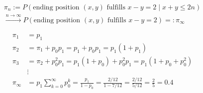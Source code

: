 \begin{solution}
\begin{enumerate}[label = (\alph*)]
    \begin{multline*}
        \pi_n
        :=
        P(\text{ending position $(x, y)$ fulfills $x - y = 2$} \mid x + y \leq 2 n) \\
        \xrightarrow{n \to \infty}
        P(\text{ending position $(x, y)$ fulfills $x - y = 2$}) =: \pi_\infty
    \end{multline*}

    \begin{align*}
        \pi_1 & = p_1 \\
        \pi_2 & = \pi_1 + p_0 p_1 = p_1 + p_0 p_1 = p_1 (1 + p_1) \\
        \pi_3 & = \pi_2 + p_0^2 p_1 = p_1 (1 + p_0) + p_0^2 p_1 = p_1 (1 + p_0 + p_0^2) \\
        & \vdots \\
        \pi_\infty & = p_1 \sum_{k=0}^\infty p_0^k = \frac{p_1}{1 - p_0} = \frac{2 / 12}{1 - 7 / 12} = \frac{2 / 12}{5 / 12} = \frac{2}{5} = 0.4
    \end{align*}

    \begin{comment}

        \begin{align*}
            &
            P(\text{ending position $(x, y)$ fulfills $|x - y| \neq 2$}) \\
            & =
            P
            \pbraces
            {
                \begin{array}{l}
                    \text{ending position is $(10, 10)$ and} \\
                    \text{robot only moves between diagonals $\Bbraces{(x+2, x)}_{x=0}^8$ and $\Bbraces{(x, x+2)}_{x=0}^8$}
                \end{array}
            } \\
            & =
            \underbrace
            {
                P(\text{robot will move to $(10, 10)$} \mid \text{robot sits at $(9, 9)$})
            }_1 \\
            & \quad
            P(\text{robot will move to $(9, 9)$} \mid \text{robot sits at $(8, 8)$}) \\
            & \quad
            \vdots \\
            & \quad
            P(\text{robot will move to $(1, 1)$} \mid \text{robot sits at $(0, 0)$}) \\
            & =
            \prod_{x=0}^8
                P(\text{robot will move to $(x+1, x+1)$} \mid \text{robot sits at $(x, x)$}) \\
            & =
            \pbraces{\frac{7}{12}}^9
        \end{align*}


\end{comment}
\end{enumerate}
\end{solution}
